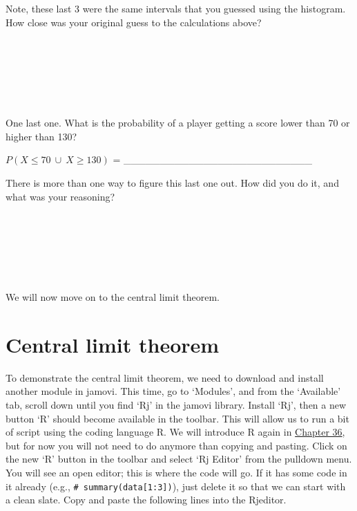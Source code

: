 \documentclass[
]{scrbook}
\begin{document}
Note, these last 3 were the same intervals that you guessed using the histogram.
How close was your original guess to the calculations above?

\begin{verbatim}






\end{verbatim}

One last one.
What is the probability of a player getting a score lower than 70 or higher than 130?

\(P(X \leq 70 \: \cup \: X \geq 130)\) = \_\_\_\_\_\_\_\_\_\_\_\_\_\_\_\_\_\_\_\_\_\_\_\_\_\_

There is more than one way to figure this last one out.
How did you do it, and what was your reasoning?

\begin{verbatim}






\end{verbatim}

We will now move on to the central limit theorem.

\hypertarget{central-limit-theorem}{%
\section{Central limit theorem}\label{central-limit-theorem}}

To demonstrate the central limit theorem, we need to download and install another module in jamovi.
This time, go to `Modules', and from the `Available' tab, scroll down until you find `Rj' in the jamovi library.
Install `Rj', then a new button `R' should become available in the toolbar.
This will allow us to run a bit of script using the coding language R.
We will introduce R again in \protect\hyperlink{Chapter_36}{Chapter 36}, but for now you will not need to do anymore than copying and pasting.
Click on the new `R' button in the toolbar and select `Rj Editor' from the pulldown menu.
You will see an open editor; this is where the code will go.
If it has some code in it already (e.g., \texttt{\#\ summary(data{[}1:3{]})}), just delete it so that we can start with a clean slate.
Copy and paste the following lines into the Rjeditor.
\end{document}
